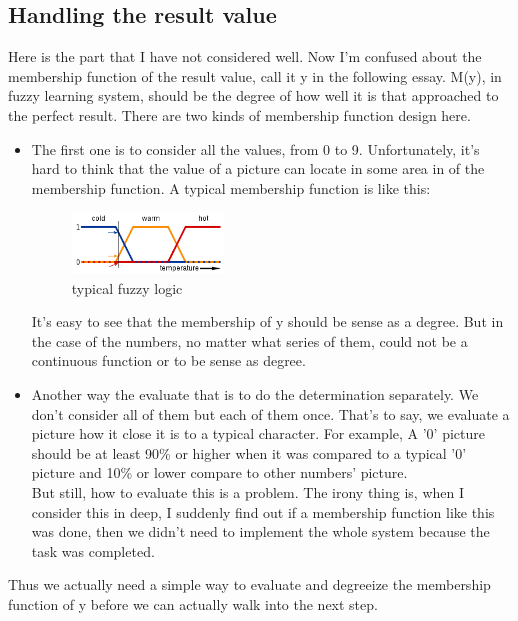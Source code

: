 \documentclass[12pt]{article} %
\begin{document}
\subsection{Handling the result value}
Here is the part that I have not considered well. Now I'm confused about the membership function of the result value, call it y in the following essay. M(y), in fuzzy learning system, should be the degree of how well it is that approached to the perfect result. There are two kinds of membership function design here. 
\begin{itemize}
    \item The first one is to consider all the values, from 0 to 9. Unfortunately, it's hard to think that the value of a picture can locate in some area in of the membership function. A typical membership function is like this:
        \begin{figure}[!htb]
            \begin{center}
                \includegraphics[width=0.38\textwidth]{fuzzyLogic}
            \end{center}
            \label{typical fuzzy logic}
            \caption{typical fuzzy logic}
        \end{figure}
        It's easy to see that the membership of y should be sense as a degree. But in the case of the numbers, no matter what series of them, could not be a continuous function or to be sense as degree. 
    \item Another way the evaluate that is to do the determination separately. We don't consider all of them but each of them once. That's to say, we evaluate a picture how it close it is to a typical character. For example, A '0' picture should be at least 90\% or higher when it was compared to a typical '0' picture and 10\% or lower compare to other numbers' picture. \\
        But still, how to evaluate this is a problem. The irony thing is, when I consider this in deep, I suddenly find out if a membership function like this was done, then we didn't need to implement the whole system because the task was completed.\\
\end{itemize}
Thus we actually need a simple way to evaluate and degreeize the membership function of y before we can actually walk into the next step.
\end{document}
